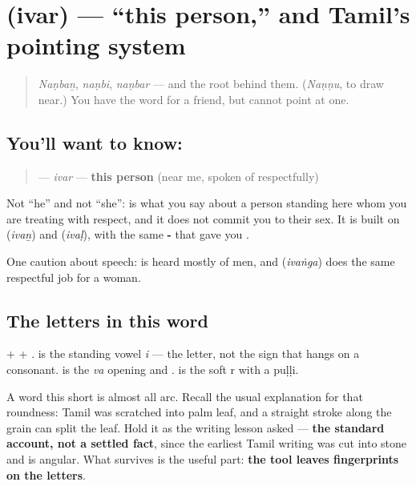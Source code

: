 \section[\texorpdfstring{\ta{இவர்} (ivar)}{இவர் (ivar)}]{ (ivar) — \textquotedblleft{}this person,\textquotedblright{} and Tamil's pointing system}

\label{lesson:TA-C37-ivar}



\begin{quote}
\emph{Naṇbaṉ}, \emph{naṇbi}, \emph{naṇbar} — and the root behind them. (\emph{Naṇṇu}, to draw near.) You have the word for a friend, but cannot point at one.
\end{quote}

\subsection*{You'll want to know: }
\begin{quote}
\textbf{} — \emph{ivar} — \textbf{this person} (near me, spoken of respectfully)
\end{quote}

Not \textquotedblleft{}he\textquotedblright{} and not \textquotedblleft{}she\textquotedblright{}: \textbf{} is what you say about a person standing here whom you are treating with respect, and it does not commit you to their sex. It is built on \textbf{} (\emph{ivaṉ}) and \textbf{} (\emph{ivaḷ}), with the same \textbf{-} that gave you \textbf{}.

One caution about speech: \textbf{} is heard mostly of men, and \textbf{} (\emph{ivaṅga}) does the same respectful job for a woman.

\subsection*{The letters in this word}
\textbf{} + \textbf{} + \textbf{}. \textbf{} is the standing vowel \emph{i} — the letter, not the \textbf{} sign that hangs on a consonant. \textbf{} is the \emph{va} opening \textbf{} and \textbf{}. \textbf{} is the soft r with a puḷḷi.

A word this short is almost all arc. Recall the usual explanation for that roundness: Tamil was scratched into palm leaf, and a straight stroke along the grain can split the leaf. Hold it as the writing lesson asked — \textbf{the standard account, not a settled fact}, since the earliest Tamil writing was cut into stone and is angular. What survives is the useful part: \textbf{the tool leaves fingerprints on the letters}.

